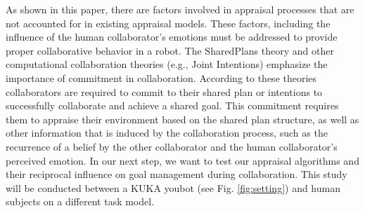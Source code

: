 As shown in this paper, there are factors involved in appraisal processes
that are not accounted for in existing appraisal models. These factors,
including the influence of the human collaborator's emotions must be addressed
to provide proper collaborative behavior in a robot. The SharedPlans theory and
other computational collaboration theories (e.g., Joint Intentions) emphasize
the importance of commitment in collaboration. According to these theories
collaborators are required to commit to their shared plan or intentions to
successfully collaborate and achieve a shared goal. This commitment requires
them to appraise their environment based on the shared plan structure, as well
as other information that is induced by the collaboration process, such as the
recurrence of a belief by the other collaborator and the human collaborator's
perceived emotion. In our next step, we want to test our appraisal algorithms
and their reciprocal influence on goal management
\cite{shayganfar:goal-management} during collaboration. This study will be
conducted between a KUKA youbot (see Fig. \ref{fig:setting}) and human subjects
on a different task model.





%
%



